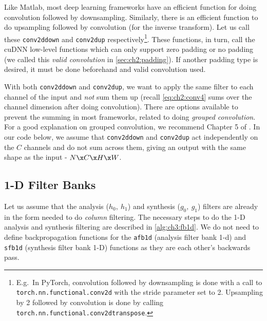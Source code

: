 {
\renewcommand{\_}{\textscale{.8}{\textunderscore}}
Like Matlab, most deep learning frameworks have an
efficient function for doing convolution followed by downsampling. Similarly,
there is an efficient function to do upsampling followed by convolution (for the
inverse transform). Let us call these \texttt{conv2d\_down} and
\texttt{conv2d\_up} respectively\footnote{E.g.\ In PyTorch, convolution followed
by downsampling is done with a call to \texttt{torch.nn.functional.conv2d} with
the stride parameter set to 2.  Upsampling by 2 followed by convolution is done
by calling \texttt{torch.nn.functional.conv2d\_transpose}.}.
These functions, in turn, call the cuDNN low-level functions which can only support
zero padding or no padding (we called this \emph{valid convolution} in
\autoref{sec:ch2:padding}). If another padding type is desired, it must be done beforehand and 
valid convolution used.

With both \texttt{conv2d\_down} and \texttt{conv2d\_up}, we want to apply the
same filter to each channel of the input and \emph{not} sum them up (recall
\eqref{eq:ch2:conv4} sums over the channel dimension after doing convolution).
There are options available to prevent the summing in most frameworks, related
to doing \emph{grouped convolution}. For a good explanation on grouped
convolution, we recommend Chapter 5 of \cite{Ioannou2017thesis}. In our code
below, we assume that \texttt{conv2d\_down} and \texttt{conv2d\_up} act
independently on the $C$ channels and do not sum across them, giving an
output with the same shape as the input - $N\x C\x H\x W$.
}

\subsection{1-D Filter Banks}
Let us assume that the analysis ($h_0,\ h_1$) and synthesis ($g_0,\ g_1$)
filters are already in the form needed to do \emph{column} filtering. The necessary
steps to do the 1-D analysis and synthesis filtering are described in
\autoref{alg:ch3:fb1d}. We do not need to define backpropagation functions for the
\texttt{afb1d} (analysis filter bank 1-d) and \texttt{sfb1d} (synthesis filter
bank 1-D) functions as they are each other's backwards pass.

